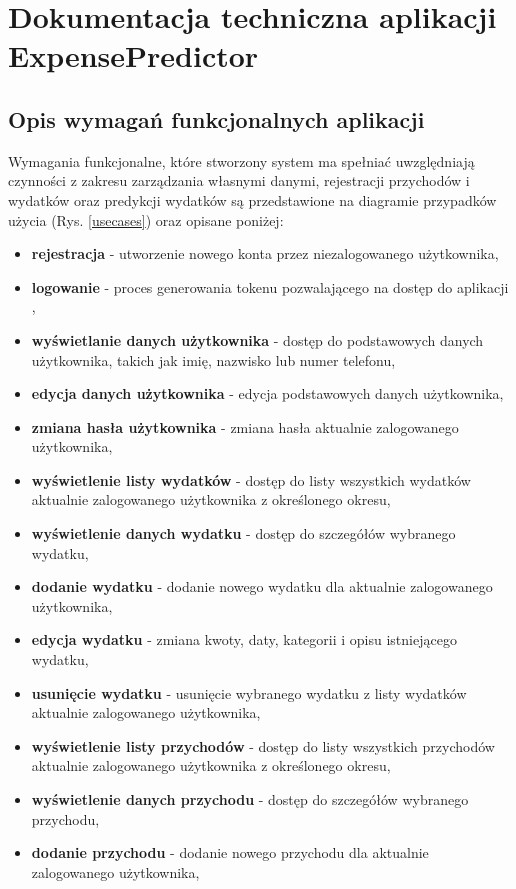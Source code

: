 \chapter{Dokumentacja techniczna aplikacji ExpensePredictor}
\section{Opis wymagań funkcjonalnych aplikacji}
Wymagania funkcjonalne, które stworzony system ma spełniać uwzględniają czynności z zakresu zarządzania własnymi danymi, rejestracji przychodów i wydatków oraz predykcji wydatków są przedstawione na diagramie przypadków użycia (Rys. \ref{usecases}) oraz opisane poniżej:
\begin{itemize}
	\item\textbf{rejestracja} - utworzenie nowego konta przez niezalogowanego użytkownika, 
	\item\textbf{logowanie} - proces generowania tokenu pozwalającego na dostęp do aplikacji ,
	\item\textbf{wyświetlanie danych użytkownika} - dostęp do podstawowych danych użytkownika, takich jak imię, nazwisko lub numer telefonu,
	\item\textbf{edycja danych użytkownika} - edycja podstawowych danych użytkownika,
	\item\textbf{zmiana hasła użytkownika} - zmiana hasła aktualnie zalogowanego użytkownika,
	\item\textbf{wyświetlenie listy wydatków} - dostęp do listy wszystkich wydatków aktualnie zalogowanego użytkownika z określonego okresu,
	\item\textbf{wyświetlenie danych wydatku} - dostęp do szczegółów wybranego wydatku,
	\item\textbf{dodanie wydatku} - dodanie nowego wydatku dla aktualnie zalogowanego użytkownika,
	\item\textbf{edycja wydatku} - zmiana kwoty, daty, kategorii i opisu istniejącego wydatku,
	\item\textbf{usunięcie wydatku} - usunięcie wybranego wydatku z listy wydatków aktualnie zalogowanego użytkownika,
	\item\textbf{wyświetlenie listy przychodów} - dostęp do listy wszystkich przychodów aktualnie zalogowanego użytkownika z określonego okresu,
	\item\textbf{wyświetlenie danych przychodu} - dostęp do szczegółów wybranego przychodu,
	\item\textbf{dodanie przychodu} - dodanie nowego przychodu dla aktualnie zalogowanego użytkownika,

\end{itemize}
